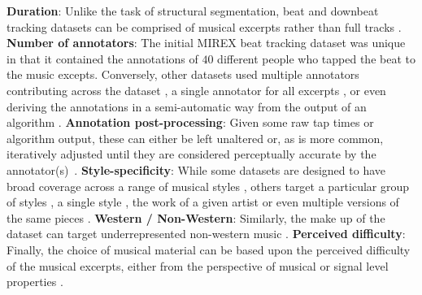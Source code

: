 \textbf{Duration}: Unlike the task of structural segmentation, beat and downbeat tracking datasets can be comprised of musical excerpts \cite{hainsworth04jasp,mckinney07jnmr,hockman12ismir, krebs13ismir} rather than full tracks \cite{Goto2002,Mauch2009a,digiorgi2016jaes,eremenko18ismir}. \textbf{Number of annotators}: The initial MIREX beat tracking dataset \cite{mckinney07jnmr} was unique in that it contained the annotations of $40$ different people who tapped the beat to the music excepts. Conversely, other datasets used multiple annotators contributing across the dataset \cite{holzapfel12taslp}, a single annotator for all excerpts \cite{hainsworth04jasp}, or even deriving the annotations in a semi-automatic way from the output of an algorithm \cite{Mauch2009a}. \textbf{Annotation post-processing}: Given some raw tap times or algorithm output, these can either be left unaltered \cite{mckinney07jnmr} or, as is more common, iteratively adjusted until they are considered perceptually accurate by the annotator(s)~\cite{holzapfel12taslp, hainsworth04jasp, hockman12ismir}. \textbf{Style-specificity}: While some datasets are designed to have broad coverage across a range of musical styles \cite{Goto2002,marchand15dafx,hainsworth04jasp}, others target a particular group of styles \cite{hockman12ismir,krebs13ismir}, a single style \cite{eremenko18ismir}, the work of a given artist \cite{Mauch2009a,digiorgi2016jaes} or even multiple versions of the same pieces \cite{sapp07ismir}. \textbf{Western / Non-Western}: Similarly, the make up of the dataset can target underrepresented non-western music \cite{srinivasamurthy14icassp, srinivasamurthy14jnmr,nunes15ismir}. \textbf{Perceived difficulty}: Finally, the choice of musical material can be based upon the perceived difficulty of the musical excerpts, either from the perspective of musical or signal level properties \cite{holzapfel12taslp}. 
